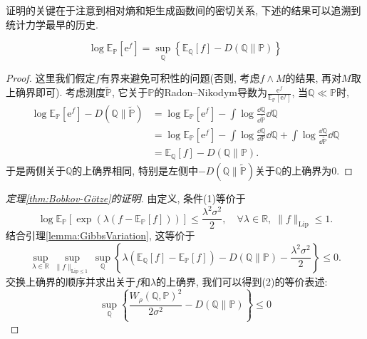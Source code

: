 证明的关键在于注意到相对熵和矩生成函数间的密切关系, 下述的结果可以追溯到统计力学最早的历史. 
\begin{lemma}[Gibbs变分原理]\label{lemma:GibbsVariation}
	\begin{equation*}
		\log \mathbb{E}_{\mathbb{P}}[\mathrm{e}^f] = \sup_{\mathbb{Q}} \left\{ \mathbb{E}_{\mathbb{Q}} [f] - D(\mathbb{Q} \| \mathbb{P}) \right\}
	\end{equation*}
\end{lemma}
\begin{proof}
	这里我们假定$f$有界来避免可积性的问题(否则, 考虑$f \wedge M$的结果, 再对$M$取上确界即可). 
	考虑测度$\tilde{\mathbb{P}}$, 它关于$\mathbb{P}$的Radon–Nikodym导数为$\frac{\mathrm{e}^{f}}{\mathbb{E}_{\mathbb{P}}[\mathrm{e}^{f}]}$, 当$\mathbb{Q} \ll \mathbb{P}$时, 
	\begin{align*}
		\log \mathbb{E}_{\mathbb{P}}[\mathrm{e}^f] - D(\mathbb{Q} \| \tilde{\mathbb{P}})
		&= \log \mathbb{E}_{\mathbb{P}}[\mathrm{e}^f] - \int \log \frac{\dd \mathbb{Q}}{\dd \tilde{\mathbb{P}}} \dd \mathbb{Q} \\
		&= \log \mathbb{E}_{\mathbb{P}}[\mathrm{e}^f] - \int \log \frac{\dd \mathbb{Q}}{\dd \mathbb{P}} \dd \mathbb{Q} + \int \log \frac{\dd \mathbb{Q}}{\dd \tilde{\mathbb{P}}} \dd \mathbb{Q} \\
		&= \mathbb{E}_{\mathbb{Q}}[f] - D(\mathbb{Q} \| \mathbb{P}). 
	\end{align*}
	于是两侧关于$\mathbb{Q}$的上确界相同, 特别是左侧中$- D(\mathbb{Q} \| \tilde{\mathbb{P}})$关于$\mathbb{Q}$的上确界为$0$.   
\end{proof}

\begin{proof}[\keben 定理\ref{thm:Bobkov-Götze}的证明]
	由定义, 条件(1)等价于
	\begin{equation*}
		\log \mathbb{E}_{\mathbb{P}} [\exp(\lambda(f - \mathbb{E}_{\mathbb{P}}[f]))] \leq \frac{\lambda^2 \sigma^2}{2}, 
		\quad \forall \lambda \in \mathbb{R},\; \|f\|_{\text{Lip}} \leq 1. 
	\end{equation*}
	结合引理\ref{lemma:GibbsVariation}, 这等价于
	\begin{equation*}
		\sup_{\lambda \in \mathbb{R}} \sup_{\|f\|_{\text{Lip} \leq 1}} \sup_{\mathbb{Q}} \left\{\lambda(\mathbb{E}_{\mathbb{Q}}[f] - \mathbb{E}_{\mathbb{P}}[f]) - D(\mathbb{Q} \| \mathbb{P}) -  \frac{\lambda^2 \sigma^2}{2} \right\} \leq 0. 
	\end{equation*}
	交换上确界的顺序并求出关于$f$和$\lambda$的上确界, 我们可以得到(2)的等价表述: 
	\begin{equation*}
		\sup_{\mathbb{Q}} \left\{\frac{W_{\rho}(\mathbb{Q}, \mathbb{P})^2}{2 \sigma^2} - D(\mathbb{Q} \| \mathbb{P}) \right\} \leq 0
	\end{equation*}
\end{proof}

